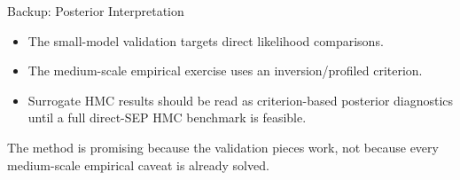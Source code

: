 \documentclass[aspectratio=169,10pt]{beamer}
\begin{document}
\begin{frame}{Backup: Posterior Interpretation}
\begin{itemize}
  \item The small-model validation targets direct likelihood comparisons.
  \item The medium-scale empirical exercise uses an inversion/profiled criterion.
  \item Surrogate HMC results should be read as criterion-based posterior
        diagnostics until a full direct-SEP HMC benchmark is feasible.
\end{itemize}

\vspace{0.5em}
\begin{center}
\small The method is promising because the validation pieces work, not because every medium-scale empirical caveat is already solved.
\end{center}
\end{frame}
\end{document}
